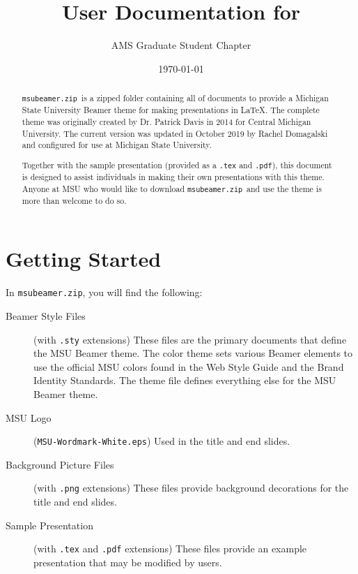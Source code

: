 \documentclass[11pt]{article}
\title{User Documentation for \zip}
\author{AMS Graduate Student Chapter}
\date{\today}
\newcommand{\zip}{\lstinline[basicstyle=\ttfamily]!msubeamer.zip!}
\newcommand{\code}[1]{\lstinline[basicstyle=\ttfamily]!#1!}
\begin{document}
\maketitle
\begin{abstract}
\zip\ is a zipped folder containing all of documents to provide a  Michigan State University Beamer theme for making presentations in \LaTeX.  The complete theme was originally created by Dr. Patrick Davis in 2014 for Central Michigan University.  The current version was updated in October 2019 by Rachel Domagalski and configured for use at Michigan State University. 

Together with the sample presentation (provided as a \code{.tex} and \code{.pdf}), this document is designed to assist individuals in making their own presentations with this theme.  Anyone at MSU who would like to download \zip\ and use the theme is more than welcome to do so.
\end{abstract}

\tableofcontents

\section*{Getting Started}

In \zip, you will find the following:
\begin{description}
     \item[Beamer Style Files] (with \lstinline[basicstyle=\ttfamily]!.sty! extensions) These files are the primary documents that define the MSU Beamer theme.  The color theme sets various Beamer elements to use the official MSU colors found in the Web Style Guide and the Brand Identity Standards.  The theme file defines everything else for the MSU Beamer theme.
     
     \item[MSU Logo] (\lstinline[basicstyle=\ttfamily]!MSU-Wordmark-White.eps!) Used in the title and end slides.
     
     \item[Background Picture Files] (with \lstinline[basicstyle=\ttfamily]!.png! extensions) These files provide background decorations for the title and end slides.
     
     \item[Sample Presentation] (with \lstinline[basicstyle=\ttfamily]!.tex! and \lstinline[basicstyle=\ttfamily]!.pdf! extensions) These files provide an example presentation that may be modified by users.
\end{description}
\end{document}
